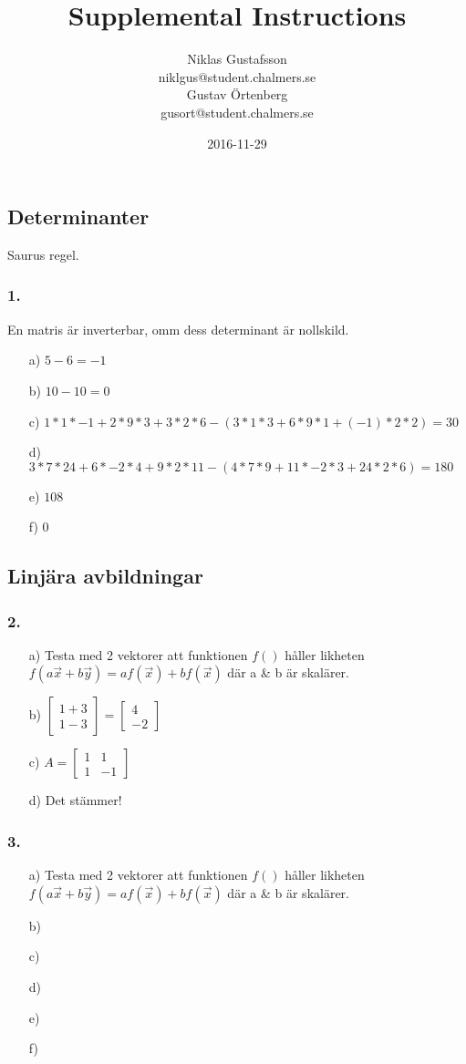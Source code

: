 \documentclass{article}
\title{Supplemental Instructions}
\author{Niklas Gustafsson \\ 
		\small{niklgus@student.chalmers.se} \\
		Gustav Örtenberg \\ 
		\small{gusort@student.chalmers.se}
}
\date{
      2016-11-29
     }
\begin{document}
\maketitle

\subsection*{Determinanter}
Saurus regel.
\subsubsection*{1.}
En matris är inverterbar, omm dess determinant är nollskild.
\begin{itemize}
	\item[a) ] $5-6=-1$
	\item[b) ] $10-10=0$
	\item[c) ] $1*1*-1+2*9*3+3*2*6-(3*1*3+6*9*1+(-1)*2*2)=30$
	\item[d) ] $3*7*24+6*-2*4+9*2*11-(4*7*9+11*-2*3+24*2*6)=180$
	\item[e) ] $108 $
	\item[f) ] $0 $
\end{itemize}

\subsection*{Linjära avbildningar}
\subsubsection*{2.}
\begin{itemize}
	\item[a) ] Testa med 2 vektorer att funktionen $f()$ håller likheten $f(a\vec{x}+b\vec{y})=af(\vec{x})+bf(\vec{x})$ där a & b är skalärer.
	\item[b) ] $\begin{bmatrix}1+3\\1-3\end{bmatrix}=\begin{bmatrix}4\\-2\end{bmatrix}$
	\item[c) ] $A=\begin{bmatrix}1&1\\1&-1\end{bmatrix}$
	\item[d) ] Det stämmer!
\end{itemize}

\subsubsection*{3.}
\begin{itemize} 
	\item[a) ] Testa med 2 vektorer att funktionen $f()$ håller likheten $f(a\vec{x}+b\vec{y})=af(\vec{x})+bf(\vec{x})$ där a & b är skalärer.
	\item[b) ] 
	\item[c) ]  
	\item[d) ] 
	\item[e) ] 
	\item[f) ] 
\end{itemize}
\end{document}
